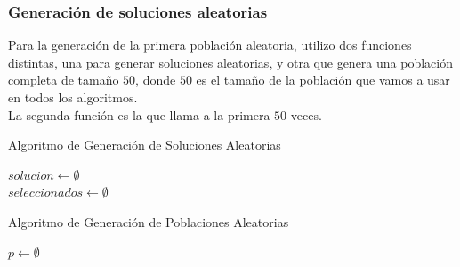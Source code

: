 \documentclass{article}
\begin{document}
\subsubsection{\small Generación de soluciones aleatorias}
Para la generación de la primera población aleatoria, utilizo dos funciones distintas, una para generar soluciones 
aleatorias, y otra que genera una población completa de tamaño $50$, donde $50$ es el tamaño de la población que vamos a usar en todos los algoritmos.\\
La segunda función es la que llama a la primera $50$ veces.
\begin{algorithm}
  \label{Algoritmo de Generacion de Soluciones Aleatorias}
  \caption{Algoritmo de Generación de Soluciones Aleatorias}
\vspace{3mm}

$solucion \leftarrow \emptyset $\\
$seleccionados \leftarrow \emptyset $\\
\vspace{3mm}

\end{algorithm}

\begin{algorithm}[H]
  \scriptsize
  \label{Algoritmo de Generacion de Poblaciones Aleatorias}
  \caption{Algoritmo de Generación de Poblaciones Aleatorias}
\vspace{3mm}

$p \leftarrow \emptyset $\\
\vspace{3mm}

\end{algorithm}
\end{document}

